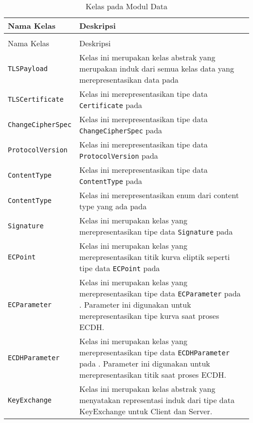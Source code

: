 \begin{longtable}{|p{3.5cm}|p{9cm}|}
    \caption{Kelas pada Modul Data} \label{tab:impl.data} \\
    \hline
    Nama Kelas & Deskripsi \\ \hline
    
    \endfirsthead
    \caption[]{Kelas pada Modul Data} \\
    
    \hline
    Nama Kelas & Deskripsi \\ \hline
    \endhead

    \texttt{TLSPayload} & Kelas ini merupakan kelas abstrak yang merupakan induk dari semua kelas data yang merepresentasikan data pada \textcite{rfc5246}\\ \hline
    \texttt{TLSCertificate} & Kelas ini merepresentasikan tipe data \texttt{Certificate} pada \textcite{rfc5246} \\ \hline
    \texttt{ChangeCipherSpec} & Kelas ini merepresentasikan tipe data \texttt{ChangeCipherSpec} pada \textcite{rfc5246} \\ \hline
    \texttt{ProtocolVersion} & Kelas ini merepresentasikan tipe data \texttt{ProtocolVersion} pada \textcite{rfc5246} \\ \hline
    \texttt{ContentType} & Kelas ini merepresentasikan tipe data \texttt{ContentType} pada \textcite{rfc5246} \\ \hline
    \texttt{ContentType} & Kelas ini merepresentasikan enum dari content type yang ada pada \textcite{rfc5246} \\ \hline
    \texttt{Signature} & Kelas ini merupakan kelas yang merepresentasikan tipe data \texttt{Signature} pada \textcite{rfc5246}\\ \hline
    \texttt{ECPoint} & Kelas ini merupakan kelas yang merepresentasikan titik kurva eliptik seperti tipe data \texttt{ECPoint} pada \textcite{rfc4492}\\ \hline
    \texttt{ECParameter} & Kelas ini merupakan kelas yang merepresentasikan tipe data \texttt{ECParameter} pada \textcite{rfc4492}. Parameter ini digunakan untuk merepresentasikan tipe kurva saat proses ECDH.\\ \hline
    \texttt{ECDHParameter} & Kelas ini merupakan kelas yang merepresentasikan tipe data \texttt{ECDHParameter} pada \textcite{rfc4492}. Parameter ini digunakan untuk merepresentasikan titik saat proses ECDH.\\ \hline
    \texttt{KeyExchange} & Kelas ini merupakan kelas abstrak yang menyatakan representasi induk dari tipe data KeyExchange untuk Client dan Server.\\ \hline

\end{longtable}

